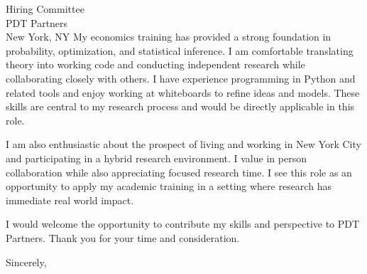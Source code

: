 \documentclass[11pt]{letter}
\begin{document}
\begin{letter}{Hiring Committee \\ PDT Partners \\ New York, NY}
My economics training has provided a strong foundation in probability, optimization, and statistical inference. I am comfortable translating theory into working code and conducting independent research while collaborating closely with others. I have experience programming in Python and related tools and enjoy working at whiteboards to refine ideas and models. These skills are central to my research process and would be directly applicable in this role.

I am also enthusiastic about the prospect of living and working in New York City and participating in a hybrid research environment. I value in person collaboration while also appreciating focused research time. I see this role as an opportunity to apply my academic training in a setting where research has immediate real world impact.

I would welcome the opportunity to contribute my skills and perspective to PDT Partners. Thank you for your time and consideration.

\closing{Sincerely,}

\end{letter}
\end{document}

